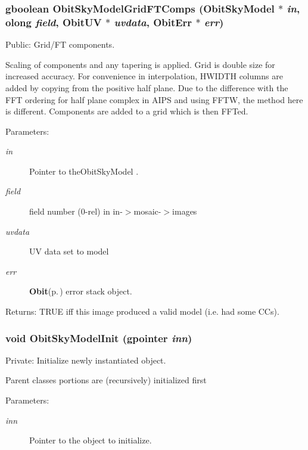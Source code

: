 \subsubsection{\setlength{\rightskip}{0pt plus 5cm}gboolean Obit\-Sky\-Model\-Grid\-FTComps ({\bf Obit\-Sky\-Model} $\ast$ {\em in}, {\bf olong} {\em field}, {\bf Obit\-UV} $\ast$ {\em uvdata}, {\bf Obit\-Err} $\ast$ {\em err})}\label{ObitSkyModel_8c_a38}


Public: Grid/FT components. 

Scaling of components and any tapering is applied. Grid is double size for increased accuracy. For convenience in interpolation, HWIDTH columns are added by copying from the positive half plane. Due to the difference with the FFT ordering for half plane complex in AIPS and using FFTW, the method here is different. Components are added to a grid which is then FFTed. \begin{Desc}
\item[Parameters:]
\begin{description}
\item[{\em in}]Pointer to the\-Obit\-Sky\-Model . \item[{\em field}]field number (0-rel) in in-$>$mosaic-$>$images \item[{\em uvdata}]UV data set to model \item[{\em err}]{\bf Obit}{\rm (p.\,\pageref{structObit})} error stack object. \end{description}
\end{Desc}
\begin{Desc}
\item[Returns:]TRUE iff this image produced a valid model (i.e. had some CCs). \end{Desc}
\subsubsection{\setlength{\rightskip}{0pt plus 5cm}void Obit\-Sky\-Model\-Init (gpointer {\em inn})}\label{ObitSkyModel_8c_a6}


Private: Initialize newly instantiated object. 

Parent classes portions are (recursively) initialized first \begin{Desc}
\item[Parameters:]
\begin{description}
\item[{\em inn}]Pointer to the object to initialize. \end{description}
\end{Desc}
